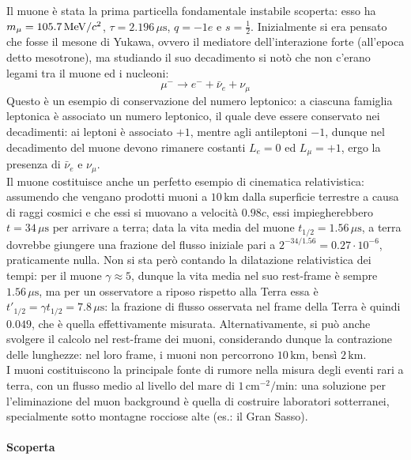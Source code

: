 Il muone è stata la prima particella fondamentale instabile scoperta: esso ha $ m_{\mu} = 105.7\,\mathrm{MeV}/c^2 $, $ \tau = 2.196\,\mu\text{s} $, $ q = -1e $ e $ s = \frac{1}{2} $. Inizialmente si era pensato che fosse il mesone di Yukawa, ovvero il mediatore dell'interazione forte (all'epoca detto mesotrone), ma studiando il suo decadimento si notò che non c'erano legami tra il muone ed i nucleoni:
\begin{equation*}
	\mu^- \rightarrow e^- + \bar{\nu}_e + \nu_{\mu}
\end{equation*}
Questo è un esempio di conservazione del numero leptonico: a ciascuna famiglia leptonica è associato un numero leptonico, il quale deve essere conservato nei decadimenti: ai leptoni è associato $ +1 $, mentre agli antileptoni $ -1 $, dunque nel decadimento del muone devono rimanere costanti $ L_e = 0 $ ed $ L_{\mu} = +1 $, ergo la presenza di $ \bar{\nu}_e $ e $ \nu_{\mu} $.\\
Il muone costituisce anche un perfetto esempio di cinematica relativistica: assumendo che vengano prodotti muoni a $ 10\,\text{km} $ dalla superficie terrestre a causa di raggi cosmici e che essi si muovano a velocità $ 0.98c $, essi impiegherebbero $ t = 34\,\mu\text{s} $ per arrivare a terra; data la vita media del muone $ t_{1/2} = 1.56\,\mu\text{s} $, a terra dovrebbe giungere una frazione del flusso iniziale pari a $ 2^{-34/1.56} = 0.27\cdot10^{-6} $, praticamente nulla. Non si sta però contando la dilatazione relativistica dei tempi: per il muone $ \gamma \approx 5 $, dunque la vita media nel suo rest-frame è sempre $ 1.56\,\mu\text{s} $, ma per un osservatore a riposo rispetto alla Terra essa è $ t'_{1/2} = \gamma t_{1/2} = 7.8\,\mu\text{s} $: la frazione di flusso osservata nel frame della Terra è quindi $ 0.049 $, che è quella effettivamente misurata. Alternativamente, si può anche svolgere il calcolo nel rest-frame dei muoni, considerando dunque la contrazione delle lunghezze: nel loro frame, i muoni non percorrono $ 10\,\text{km} $, bensì $ 2\,\text{km} $.\\
I muoni costituiscono la principale fonte di rumore nella misura degli eventi rari a terra, con un flusso medio al livello del mare di $ 1\,\text{cm}^{-2} / \text{min} $: una soluzione per l'eliminazione del muon background è quella di costruire laboratori sotterranei, specialmente sotto montagne rocciose alte (es.: il Gran Sasso).

\paragraph{Scoperta}

